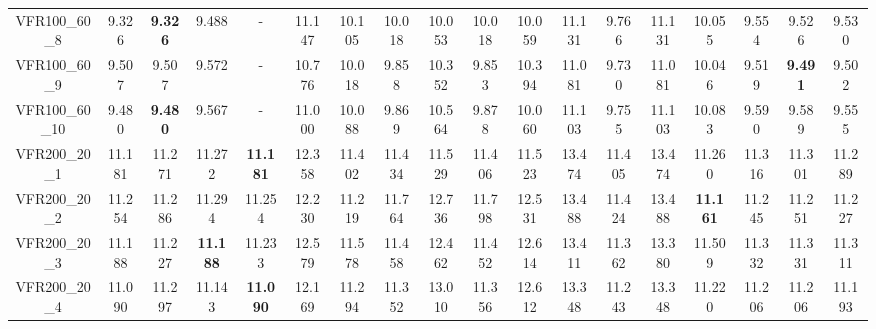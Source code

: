 \begin{tabular}{cc|ccc|ccccccccccccc}
VFR100\_60\_8      & 9.326            & {\bf 9.326}      & 9.488            & -                & 11.147           & 10.105           & 10.018           & 10.053           & 10.018           & 10.059           & 11.131           & 9.766            & 11.131           & 10.055           & 9.554            & 9.526            & 9.530           \\ 
VFR100\_60\_9      & 9.507            & 9.507            & 9.572            & -                & 10.776           & 10.018           & 9.858            & 10.352           & 9.853            & 10.394           & 11.081           & 9.730            & 11.081           & 10.046           & 9.519            & {\bf 9.491}      & 9.502           \\ 
VFR100\_60\_10     & 9.480            & {\bf 9.480}      & 9.567            & -                & 11.000           & 10.088           & 9.869            & 10.564           & 9.878            & 10.060           & 11.103           & 9.755            & 11.103           & 10.083           & 9.590            & 9.589            & 9.555           \\ 
VFR200\_20\_1      & 11.181           & 11.271           & 11.272           & {\bf 11.181}     & 12.358           & 11.402           & 11.434           & 11.529           & 11.406           & 11.523           & 13.474           & 11.405           & 13.474           & 11.260           & 11.316           & 11.301           & 11.289          \\ 
VFR200\_20\_2      & 11.254           & 11.286           & 11.294           & 11.254           & 12.230           & 11.219           & 11.764           & 12.736           & 11.798           & 12.531           & 13.488           & 11.424           & 13.488           & {\bf 11.161}     & 11.245           & 11.251           & 11.227          \\ 
VFR200\_20\_3      & 11.188           & 11.227           & {\bf 11.188}     & 11.233           & 12.579           & 11.578           & 11.458           & 12.462           & 11.452           & 12.614           & 13.411           & 11.362           & 13.380           & 11.509           & 11.332           & 11.331           & 11.311          \\ 
VFR200\_20\_4      & 11.090           & 11.297           & 11.143           & {\bf 11.090}     & 12.169           & 11.294           & 11.352           & 13.010           & 11.356           & 12.612           & 13.348           & 11.243           & 13.348           & 11.220           & 11.206           & 11.206           & 11.193          \\ 

\end{tabular}
